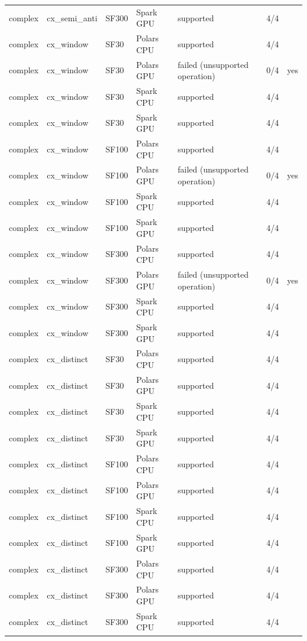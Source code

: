 \begin{longtable}{lllllll}
complex & cx\_semi\_anti & SF300 & Spark GPU & supported & 4/4 &  \\
complex & cx\_window & SF30 & Polars CPU & supported & 4/4 &  \\
complex & cx\_window & SF30 & Polars GPU & failed (unsupported operation) & 0/4 & yes \\
complex & cx\_window & SF30 & Spark CPU & supported & 4/4 &  \\
complex & cx\_window & SF30 & Spark GPU & supported & 4/4 &  \\
complex & cx\_window & SF100 & Polars CPU & supported & 4/4 &  \\
complex & cx\_window & SF100 & Polars GPU & failed (unsupported operation) & 0/4 & yes \\
complex & cx\_window & SF100 & Spark CPU & supported & 4/4 &  \\
complex & cx\_window & SF100 & Spark GPU & supported & 4/4 &  \\
complex & cx\_window & SF300 & Polars CPU & supported & 4/4 &  \\
complex & cx\_window & SF300 & Polars GPU & failed (unsupported operation) & 0/4 & yes \\
complex & cx\_window & SF300 & Spark CPU & supported & 4/4 &  \\
complex & cx\_window & SF300 & Spark GPU & supported & 4/4 &  \\
complex & cx\_distinct & SF30 & Polars CPU & supported & 4/4 &  \\
complex & cx\_distinct & SF30 & Polars GPU & supported & 4/4 &  \\
complex & cx\_distinct & SF30 & Spark CPU & supported & 4/4 &  \\
complex & cx\_distinct & SF30 & Spark GPU & supported & 4/4 &  \\
complex & cx\_distinct & SF100 & Polars CPU & supported & 4/4 &  \\
complex & cx\_distinct & SF100 & Polars GPU & supported & 4/4 &  \\
complex & cx\_distinct & SF100 & Spark CPU & supported & 4/4 &  \\
complex & cx\_distinct & SF100 & Spark GPU & supported & 4/4 &  \\
complex & cx\_distinct & SF300 & Polars CPU & supported & 4/4 &  \\
complex & cx\_distinct & SF300 & Polars GPU & supported & 4/4 &  \\
complex & cx\_distinct & SF300 & Spark CPU & supported & 4/4 &  \\

\end{longtable}
